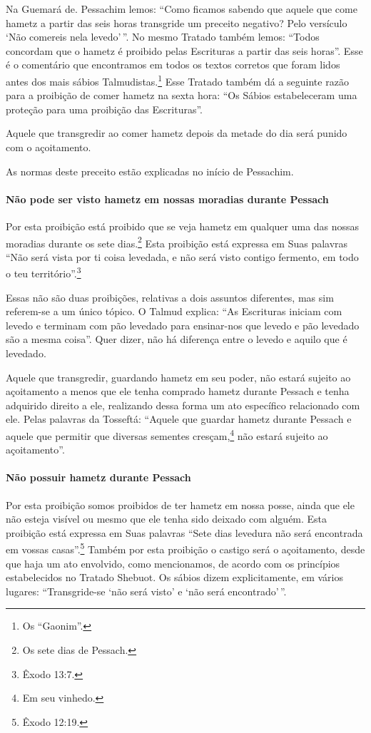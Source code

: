 Na Guemará de. Pessachim lemos: ``Como ficamos sabendo que aquele que
come hametz a partir das seis horas transgride um preceito negativo?
Pelo versículo `Não comereis nela levedo'\,''. No mesmo Tratado também
lemos: ``Todos concordam que o hametz é proibido pelas Escrituras a
partir das seis horas''. Esse é o comentário que encontramos em todos os
textos corretos que foram lidos antes dos mais sábios
Talmudistas.\footnote{Os ``Gaonim''.} Esse Tratado também dá a seguinte
razão para a proibição de comer hametz na sexta hora: ``Os Sábios
estabeleceram uma proteção para uma proibição das Escrituras''.

Aquele que transgredir ao comer hametz depois da metade do dia será
punido com o açoitamento.

As normas deste preceito estão explicadas no início de Pessachim.

\paragraph{Não pode ser visto hametz em nossas moradias durante Pessach}

Por esta proibição está proibido que se veja hametz em qualquer uma
das nossas moradias durante os sete dias.\footnote{Os sete dias de Pessach.} Esta
proibição está expressa em Suas palavras ``Não será vista por ti coisa
levedada, e não será visto contigo fermento, em todo o teu território''.\footnote{Êxodo 13:7.}

Essas não são duas proibições, relativas a dois assuntos diferentes, mas
sim referem-se a um único tópico. O Talmud explica: ``As Escrituras
iniciam com levedo e terminam com pão levedado para ensinar-nos que
levedo e pão levedado são a mesma coisa''. Quer dizer, não há diferença
entre o levedo e aquilo que é levedado.

Aquele que transgredir, guardando hametz em seu poder, não estará
sujeito ao açoitamento a menos que ele tenha comprado hametz
durante Pessach e tenha adquirido direito a ele, realizando dessa
forma um ato específico relacionado com ele. Pelas palavras da
Tosseftá: ``Aquele que guardar hametz durante Pessach e aquele que
permitir que diversas sementes cresçam,\footnote{Em seu vinhedo.} não estará sujeito ao açoitamento''.

\paragraph{Não possuir hametz durante Pessach}

Por esta proibição somos proibidos de ter hametz em nossa posse,
ainda que ele não esteja visível ou mesmo que ele tenha sido deixado com
alguém. Esta proibição está expressa em Suas palavras ``Sete dias
levedura não será encontrada em vossas casas''.\footnote{Êxodo 12:19.} Também por
esta proibição o castigo será o açoitamento, desde que haja um ato
envolvido, como mencionamos, de acordo com os princípios estabelecidos
no Tratado Shebuot. Os sábios dizem explicitamente, em vários lugares:
``Transgride-se `não será visto' e `não será encontrado'\,''.

